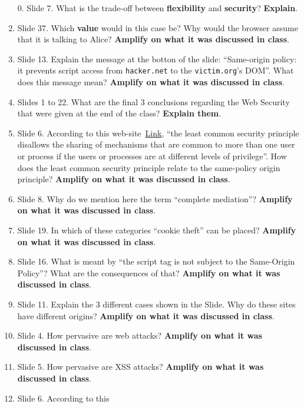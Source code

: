 \documentclass{article}
\begin{document}
\begin{enumerate}
\item[0.] Slide 7. What is the trade-off between \textbf{flexibility}
  and \textbf{security}? \textbf{Explain}.

\item  Slide 37. Which \textbf{value} would in this case be? Why
  would the browser assume that it is talking to Alice?
  \textbf{Amplify on what it was discussed in class}.
%
\item Slide 13. Explain the message at the botton of the slide: ``Same-origin policy: it
  prevents script access from \texttt{hacker.net} to the \texttt{victim.org}’s
  DOM''. What does this message mean? 
  \textbf{Amplify on what it was discussed in class}.
\item Slides 1 to 22. What are the final 3 conclusions regarding the
  Web Security that were given at the end of the class?
  \textbf{Explain them}. 
\item Slide 6. According to this
  web-site~\href{https://owasp.org/www-project-developer-guide/draft/foundations/security_principles}{Link},
  ``the least common security principle disallows the sharing of
  mechanisms that are common to more than one user or process if the
  users or processes are at different levels of privilege''. How does
  the least common security principle relate to the same-policy origin
  principle? \textbf{Amplify on what it was discussed in class}.
\item Slide 8. Why do we mention here the term ``complete mediation''? \textbf{Amplify on what it
  was discussed in class}. 
\item Slide 19. In which of these categories ``cookie theft'' can be placed? \textbf{Amplify on
  what it was discussed in class}. 
\item Slide 16. What is meant by ``the script  tag is not subject to the Same-Origin
  Policy''? What are the consequences of that? 
  \textbf{Amplify on what it was discussed in class}.
\item Slide 11. Explain the 3 different cases shown in the Slide. Why do these sites
  have different origins?  \textbf{Amplify on what it was discussed in class}. 
\item Slide 4. How pervasive are web attacks? \textbf{Amplify on what it
  was discussed in class}. 
\item Slide 5. How pervasive are XSS attacks? \textbf{Amplify on what it
  was discussed in class}.  
% 
\item Slide 6. According to this

\end{enumerate}
\end{document}
